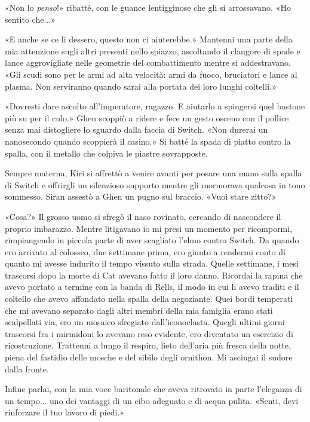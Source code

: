 «Non lo \emph{penso}!» ribatté, con le guance lentigginose che gli si
arrossavano. «Ho sentito che...»

«E anche se ce li dessero, questo non ci aiuterebbe.» Mantenni una parte
della mia attenzione sugli altri presenti nello spiazzo, ascoltando il
clangore di spade e lance aggrovigliate nelle geometrie del
combattimento mentre si addestravano. «Gli scudi sono per le armi ad
alta velocità: armi da fuoco, bruciatori e lance al plasma. Non
serviranno quando sarai alla portata dei loro lunghi coltelli.»

«Dovresti dare ascolto all'imperatore, ragazzo. E aiutarlo a spingersi
quel bastone più su per il culo.» Ghen scoppiò a ridere e fece un gesto
osceno con il pollice senza mai distogliere lo sguardo dalla faccia di
Switch. «Non durerai un nanosecondo quando scoppierà il casino.» Si
batté la spada di piatto contro la spalla, con il metallo che colpiva le
piastre sovrapposte.

Sempre materna, Kiri si affrettò a venire avanti per posare una mano
sulla spalla di Switch e offrirgli un silenzioso supporto mentre gli
mormorava qualcosa in tono sommesso. Siran assestò a Ghen un pugno sul
braccio. «Vuoi stare zitto?»

«Cosa?» Il grosso uomo si sfregò il naso rovinato, cercando di
nascondere il proprio imbarazzo. Mentre litigavano io mi presi un
momento per ricompormi, rimpiangendo in piccola parte di aver scagliato
l'elmo contro Switch. Da quando ero arrivato al colosseo, due settimane
prima, ero giunto a rendermi conto di quanto mi avesse indurito il tempo
vissuto sulla strada. Quelle settimane, i mesi trascorsi dopo la morte
di Cat avevano fatto il loro danno. Ricordai la rapina che avevo portato
a termine con la banda di Rells, il modo in cui li avevo traditi e il
coltello che avevo affondato nella spalla della negoziante. Quei bordi
temperati che mi avevano separato dagli altri membri della mia famiglia
erano stati scalpellati via, ero un mosaico sfregiato dall'iconoclasta.
Quegli ultimi giorni trascorsi fra i mirmidoni lo avevano reso evidente,
ero diventato un esercizio di ricostruzione. Trattenni a lungo il
respiro, lieto dell'aria più fresca della notte, piena del fastidio
delle mosche e del sibilo degli ornithon. Mi asciugai il sudore dalla
fronte.

Infine parlai, con la mia voce baritonale che aveva ritrovato in parte
l'eleganza di un tempo... uno dei vantaggi di un cibo adeguato e di
acqua pulita. «Senti, devi rinforzare il tuo lavoro di piedi.»

